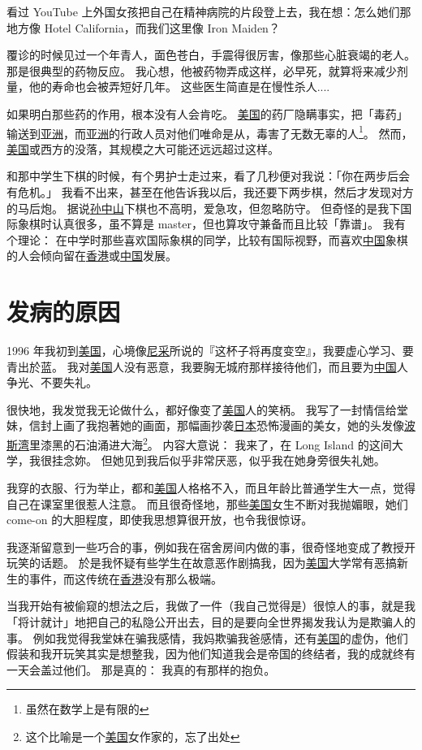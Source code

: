 \documentclass[12pt]{report}
\begin{document}
{看过 YouTube 上外国女孩把自己在精神病院的片段登上去，我在想：怎么她们那地方像 Hotel California，而我们这里像 Iron Maiden？

覆诊的时候见过一个年青人，面色苍白，手震得很厉害，像那些心脏衰竭的老人。 那是很典型的药物反应。 我心想，他被药物弄成这样，必早死，就算将来减少剂量，他的寿命也会被弄短好几年。 这些医生简直是在慢性杀人....

如果明白那些药的作用，根本没有人会肯吃。 \uline{美国}的药厂隐瞒事实，把「毒药」输送到\uline{亚洲}，而\uline{亚洲}的行政人员对他们唯命是从，毒害了无数无辜的人\footnote{虽然在数学上是有限的}。 然而，\uline{美国}或西方的没落，其规模之大可能还远远超过这样。

和那中学生下棋的时候，有个男护士走过来，看了几秒便对我说：「你在两步后会有危机。」 我看不出来，甚至在他告诉我以后，我还要下两步棋，然后才发现对方的马后炮。 据说\uline{孙中山}下棋也不高明，爱急攻，但忽略防守。 但奇怪的是我下国际象棋时认真很多，虽不算是 master，但也算攻守兼备而且比较「靠谱」。 我有个理论： 在中学时那些喜欢国际象棋的同学，比较有国际视野，而喜欢\uline{中国}象棋的人会倾向留在\uline{香港}或\uline{中国}发展。

\chapter{发病的原因}
\label{cause-of-illness}

1996 年我初到\uline{美国}，心境像\uline{尼采}所说的『这杯子将再度变空』，我要虚心学习、要青出於蓝。 我对\uline{美国}人没有恶意，我要胸无城府那样接待他们，而且要为\uline{中国}人争光、不要失礼。

很快地，我发觉我无论做什么，都好像变了\uline{美国}人的笑柄。 我写了一封情信给堂妹，信封上画了我抱著她的画面，那幅画抄袭\uline{日本}恐怖漫画的美女，她的头发像\uline{波斯湾}里漆黑的石油涌进大海\footnote{这个比喻是一个\uline{美国}女作家的，忘了出处}。 内容大意说： 我来了，在 Long Island 的这间大学，我很挂念妳。 但她见到我后似乎非常厌恶，似乎我在她身旁很失礼她。

我穿的衣服、行为举止，都和\uline{美国}人格格不入，而且年龄比普通学生大一点，觉得自己在课室里很惹人注意。 而且很奇怪地，那些\uline{美国}女生不断对我抛媚眼，她们 come-on 的大胆程度，即使我思想算很开放，也令我很惊讶。

我逐渐留意到一些巧合的事，例如我在宿舍房间内做的事，很奇怪地变成了教授开玩笑的话题。 於是我怀疑有些学生在故意恶作剧搞我，因为\uline{美国}大学常有恶搞新生的事件，而这传统在\uline{香港}没有那么极端。

当我开始有被偷窥的想法之后，我做了一件（我自己觉得是）很惊人的事，就是我「将计就计」地把自己的私隐公开出去，目的是要向全世界揭发我认为是欺骗人的事。  例如我觉得我堂妹在骗我感情，我妈欺骗我爸感情，还有\uline{美国}的虚伪，他们假装和我开玩笑其实是想整我，因为他们知道我会是帝国的终结者，我的成就终有一天会盖过他们。 那是真的： 我真的有那样的抱负。

}
\end{document}
